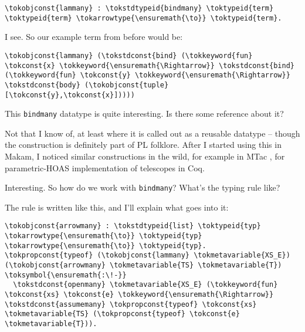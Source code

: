 \importantCodeblock{}

\begin{verbatim}
\tokobjconst{lammany} : \tokstdtypeid{bindmany} \toktypeid{term} \toktypeid{term} \tokarrowtype{\ensuremath{\to}} \toktypeid{term}.
\end{verbatim}

\importantCodeblockEnd{}

\heroSTUDENT{} I see. So our example term from before would be:

\begin{verbatim}
\tokobjconst{lammany} (\tokstdconst{bind} (\tokkeyword{fun} \tokconst{x} \tokkeyword{\ensuremath{\Rightarrow}} \tokstdconst{bind} (\tokkeyword{fun} \tokconst{y} \tokkeyword{\ensuremath{\Rightarrow}} \tokstdconst{body} (\tokobjconst{tuple} [\tokconst{y},\tokconst{x}]))))
\end{verbatim}

\noindent
This \texttt{bindmany} datatype is quite interesting. Is there some
reference about it?

\heroADVISOR{} Not that I know of, at least where it is called out as a
reusable datatype -- though the construction is definitely part of PL
folklore. After I started using this in Makam, I noticed similar
constructions in the wild, for example in MTac \citep{ziliani2013mtac},
for parametric-HOAS implementation of telescopes in Coq.

\heroSTUDENT{} Interesting. So how do we work with \texttt{bindmany}? What's
the typing rule like?

\heroADVISOR{} The rule is written like this, and I'll explain what goes into
it:

\importantCodeblock{}

\begin{verbatim}
\tokobjconst{arrowmany} : \tokstdtypeid{list} \toktypeid{typ} \tokarrowtype{\ensuremath{\to}} \toktypeid{typ} \tokarrowtype{\ensuremath{\to}} \toktypeid{typ}.
\tokpropconst{typeof} (\tokobjconst{lammany} \tokmetavariable{XS_E}) (\tokobjconst{arrowmany} \tokmetavariable{TS} \tokmetavariable{T}) \toksymbol{\ensuremath{:\!-}}
  \tokstdconst{openmany} \tokmetavariable{XS_E} (\tokkeyword{fun} \tokconst{xs} \tokconst{e} \tokkeyword{\ensuremath{\Rightarrow}} \tokstdconst{assumemany} \tokpropconst{typeof} \tokconst{xs} \tokmetavariable{TS} (\tokpropconst{typeof} \tokconst{e} \tokmetavariable{T})).
\end{verbatim}

\importantCodeblockEnd{}

